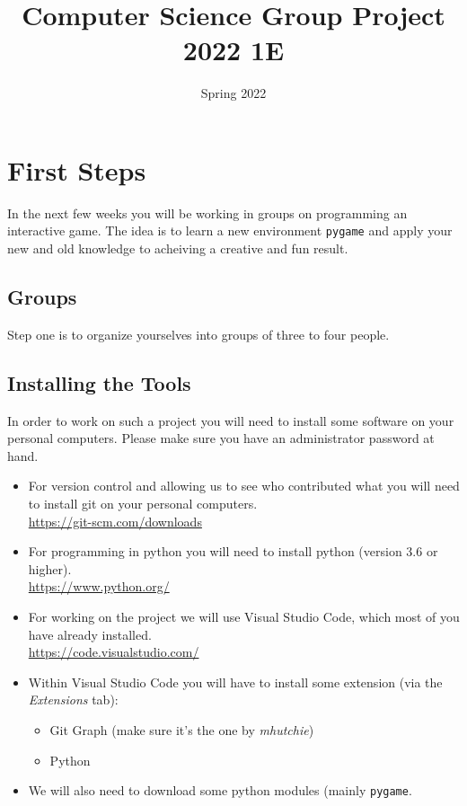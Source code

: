 \documentclass[11pt,a4paper]{report}
\title{Computer Science Group Project 2022 1E}
\date{Spring 2022}
\begin{document}
\maketitle

\newpage
\section{First Steps}
In the next few weeks you will be working in groups on programming an interactive game. The idea is to learn a new environment \verb|pygame| and apply your new and old knowledge to acheiving a creative and fun result.
\subsection{Groups}
Step one is to organize yourselves into groups of three to four people. 
\subsection{Installing the Tools}
In order to work on such a project you will need to install some software on your personal computers. Please make sure you have an administrator password at hand. 
\begin{itemize}
\item For version control and allowing us to see who contributed what you will need to install git on your personal computers. \\
\url{https://git-scm.com/downloads}
\item For programming in python you will need to install python (version 3.6 or higher). \\
\url{https://www.python.org/}
\item For working on the project we will use Visual Studio Code, which most of you have already installed.\\
\url{https://code.visualstudio.com/}
\item Within Visual Studio Code you will have to install some extension (via the \emph{Extensions} tab):
\begin{itemize}
\item Git Graph (make sure it's the one by \emph{mhutchie})
\item Python
\end{itemize}
\item We will also need to download some python modules (mainly \verb|pygame|.

\end{itemize}
\end{document}

